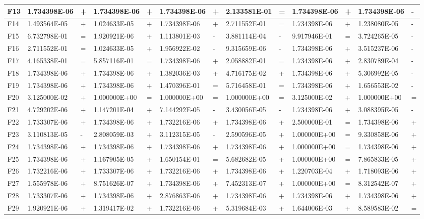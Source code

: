 \documentclass{article} %
\begin{document}
\begin{tabular}{|p{0.3in}|p{0.6in}|p{0.2in}|p{0.6in}|p{0.2in}|p{0.6in}|p{0.2in}|p{0.7in}|p{0.2in}|p{0.6in}|p{0.2in}|p{0.6in}|p{0.2in}|}
F13 & 1.734398E-06 & + & 1.734398E-06 & + & 1.734398E-06 & + & 2.133581E-01 & = & 1.734398E-06 & + & 1.734398E-06 & - \\ \hline 
F14 & 1.493564E-05 & + & 1.024633E-05 & + & 1.734398E-06 & + & 2.711552E-01 & = & 1.734398E-06 & + & 1.238080E-05 & - \\ \hline 
F15 & 6.732798E-01 & = & 1.920921E-06 & + & 1.113801E-03 & - & 3.881114E-04 & - & 9.917946E-01 & = & 3.724265E-05 & - \\ \hline 
F16 & 2.711552E-01 & = & 1.024633E-05 & + & 1.956922E-02 & - & 9.315659E-06 & - & 1.734398E-06 & + & 3.515237E-06 & - \\ \hline 
F17 & 4.165338E-01 & = & 5.857116E-01 & = & 1.734398E-06 & + & 2.058882E-01 & = & 1.734398E-06 & + & 2.830789E-04 & - \\ \hline 
F18 & 1.734398E-06 & + & 1.734398E-06 & + & 1.382036E-03 & + & 4.716175E-02 & + & 1.734398E-06 & + & 5.306992E-05 & - \\ \hline 
F19 & 1.734398E-06 & + & 1.734398E-06 & + & 1.470396E-01 & = & 5.716458E-01 & = & 1.734398E-06 & + & 1.656553E-02 & - \\ \hline 
F20 & 3.125000E-02 & + & 1.000000E+00 & = & 1.000000E+00 & = & 1.000000E+00 & = & 3.125000E-02 & + & 1.000000E+00 & = \\ \hline 
F21 & 4.729202E-06 & + & 1.147201E-04 & + & 7.144292E-05 & - & 3.430056E-05 & - & 1.734398E-06 & + & 3.088395E-05 & - \\ \hline 
F22 & 1.733307E-06 & + & 1.734398E-06 & + & 1.732216E-06 & + & 1.734398E-06 & + & 2.500000E-01 & = & 1.734398E-06 & + \\ \hline 
F23 & 3.110813E-05 & - & 2.808059E-03 & + & 3.112315E-05 & - & 2.590596E-05 & + & 1.000000E+00 & = & 9.330858E-06 & + \\ \hline 
F24 & 1.734398E-06 & + & 1.734398E-06 & + & 1.734398E-06 & + & 1.734398E-06 & + & 1.000000E+00 & = & 1.734398E-06 & + \\ \hline 
F25 & 1.734398E-06 & + & 1.167905E-05 & + & 1.650154E-01 & = & 5.682682E-05 & + & 1.000000E+00 & = & 7.865833E-05 & + \\ \hline 
F26 & 1.732216E-06 & + & 1.733307E-06 & + & 1.732216E-06 & + & 1.734398E-06 & + & 1.220703E-04 & + & 1.718093E-06 & + \\ \hline 
F27 & 1.555978E-06 & + & 8.751626E-07 & + & 1.734398E-06 & + & 7.452313E-07 & + & 1.000000E+00 & = & 8.312542E-07 & + \\ \hline 
F28 & 1.733307E-06 & + & 1.734398E-06 & + & 2.876863E-06 & + & 1.734398E-06 & + & 1.734398E-06 & + & 1.734398E-06 & + \\ \hline 
F29 & 1.920921E-06 & + & 1.319417E-02 & + & 1.732216E-06 & + & 5.319684E-03 & + & 1.644006E-03 & + & 8.589583E-02 & = \\ \hline 
\end{tabular}
\end{document}
